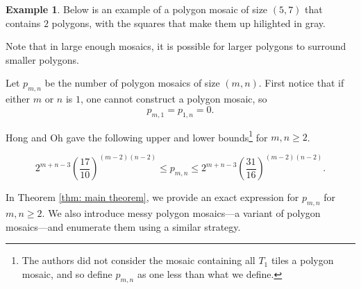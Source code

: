 \documentclass[12pt]{article}
\theoremstyle{plain}
\theoremstyle{definition}
\theoremstyle{remark}
\theoremstyle{definition}
\newtheorem{exmp}{Example}[section]
\newcommand{\cell}[4]{ \draw[thick] ( #1 , #2 ) rectangle ( #3 , #4 );}
\newcommand{\cellAf}[4]{\filldraw[gray!40] ( #1 , #2 ) rectangle ( #3 , #4 ); \draw[thick] ( #1 , #2 ) rectangle ( #3 , #4 ); \draw[red, thick, densely dotted] (#3 * 0.5 + #1 * 0.5 , #2) -- (#3, #4 * 0.5 + #2 * 0.5);}
\newcommand{\cellBf}[4]{\filldraw[gray!40] ( #1 , #2 ) rectangle ( #3 , #4 ); \draw[thick] ( #1 , #2 ) rectangle ( #3 , #4 ); \draw[red, thick, densely dotted] (#3 * 0.5 + #1 * 0.5 , #2) -- (#1, #4 * 0.5 + #2 * 0.5);}
\newcommand{\cellCf}[4]{\filldraw[gray!40] ( #1 , #2 ) rectangle ( #3 , #4 ); \draw[thick] ( #1 , #2 ) rectangle ( #3 , #4 ); \draw[red, thick, densely dotted] (#3 * 0.5 + #1 * 0.5 , #4) -- (#1, #4 * 0.5 + #2 * 0.5);}
\newcommand{\cellDf}[4]{\filldraw[gray!40] ( #1 , #2 ) rectangle ( #3 , #4 ); \draw[thick] ( #1 , #2 ) rectangle ( #3 , #4 ); \draw[red, thick, densely dotted] (#3 * 0.5 + #1 * 0.5 , #4) -- (#3, #4 * 0.5 + #2 * 0.5);}
\newcommand{\cellEf}[4]{\filldraw[gray!40] ( #1 , #2 ) rectangle ( #3 , #4 ); \draw[thick] ( #1 , #2 ) rectangle ( #3 , #4 ); \draw[red, thick, densely dotted] (#3 * 0.5 + #1 * 0.5 , #2) -- (#3 * 0.5 + #1 * 0.5 , #4);}
\newcommand{\cellFf}[4]{\filldraw[gray!40] ( #1 , #2 ) rectangle ( #3 , #4 ); \draw[thick] ( #1 , #2 ) rectangle ( #3 , #4 ); \draw[red, thick, densely dotted] (#3, #4 * 0.5 + #2 * 0.5) -- (#1, #4 * 0.5 + #2 * 0.5);}
\begin{document}
\begin{exmp}
\label{exmp: clean sap}
Below is an example of a polygon mosaic of size $(5,7)$ that contains $2$ polygons, with the squares that make them up hilighted in gray.

\begin{center}
\end{center}
\end{exmp}

Note that in large enough mosaics, it is possible for larger polygons to surround smaller polygons. 

Let $p_{m,n}$ be the number of polygon mosaics of size $(m,n)$. First notice that if either $m$ or $n$ is $1$, one cannot construct a polygon mosaic, so 
$$p_{m,1} = p_{1,n} = 0.$$

Hong and Oh \cite[Hong2018]{Hong2018} gave the following upper and lower bounds\footnote{The authors did not consider the mosaic containing all $T_1$ tiles a polygon mosaic, and so define $p_{m,n}$ as one less than what we define.} for $m,n \geq 2$. 

$$2^{m+n-3} \left(\frac{17}{10}\right)^{(m-2)(n-2)} \leq p_{m,n} \leq 2^{m+n-3} \left(\frac{31}{16}\right)^{(m-2)(n-2)}.$$

In Theorem \ref{thm: main theorem}, we provide an exact expression for $p_{m,n}$ for $m,n \geq 2$. We also introduce messy polygon mosaics—a variant of polygon mosaics—and enumerate them using a similar strategy.
\end{document}
